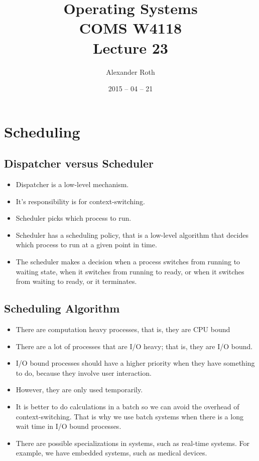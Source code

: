 \documentclass[]{article}
\begin{document}
\newtheorem{thm}{Theorem}
\title{Operating Systems \\ COMS W4118 \\ Lecture 23}
\author{Alexander Roth}
\date{2015 -- 04 -- 21}
\maketitle

\section{Scheduling}
\subsection{Dispatcher versus Scheduler}
\begin{itemize}
\item Dispatcher is a low-level mechanism.
\item It's responsibility is for context-switching.
\item Scheduler picks which process to run.
\item Scheduler has a scheduling policy, that is a low-level algorithm that
decides which process to run at a given point in time.
\item The scheduler makes a decision when a process switches from running to
waiting state, when it switches from running to ready, or when it switches from
waiting to ready, or it terminates.
\end{itemize}

\subsection{Scheduling Algorithm}
\begin{itemize}
\item There are computation heavy processes, that is, they are CPU bound
\item There are a lot of processes that are I/O heavy; that is, they are I/O
bound.
\item I/O bound processes should have a higher priority when they have something
to do, because they involve user interaction.
\item However, they are only used temporarily.
\item It is better to do calculations in a batch so we can avoid the overhead of
context-switching. That is why we use batch systems when there is a long wait
time in I/O bound processes.
\item There are possible specializations in systems, such as real-time systems.
For example, we have embedded systems, such as medical devices.
\end{itemize}
\end{document}
